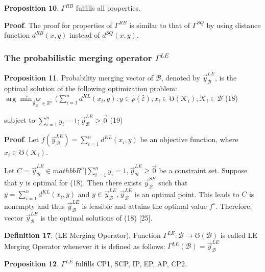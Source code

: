 \documentclass[10pt,a4paper]{IOS-Book-Article}
\begin{document}
\textbf{Proposition 10}. $\Gamma^{RB}$ fulfills all properties.

\textbf{Proof}. The proof for properties of $\Gamma^{RB}$ is similar
to that of $\Gamma^{SQ}$ by using distance function $d^{RB}(x, y)$
instead of $d^{SQ}(x, y)$.

\subsubsection{The probabilistic merging operator $\Gamma^{LE}$}

\textbf{Proposition 11}. Probability merging vector of $\mathcal{B}$,
denoted by $\vec{y}^{LE}_\mathcal{B}$, is the optimal solution of the following optimization problem:
$\arg \min_{\vec{y}^{LE}_\mathcal{B} \in \mathbb{R}^n} (\sum^n_{i=1} d^{KL}(x_i, y) : 
y \in \hat{p}(\hat{\varepsilon}); x_i \in \mho(\mathcal{K}_i);\mathcal{K}_i \in \mathcal{B}$ (18)

subject to $\sum^n_{i=1} y_i = 1; \vec{y}^{LE}_\mathcal{B} \geq \vec{0}$ (19)

\textbf{Proof}. Let $f(\vec{y}^{LE}_\mathcal{B} ) = \sum^n_{i=1} d^{KL}(x_i, y)$ be an objective function, where $x_i \in \mho(\mathcal{K}_i)$.

Let $C = {\vec{y}^{LE}_\mathcal{B} \in mathbb{R}^n|\sum^n_{i=1} y_i = 1, \vec{y}^{LE}_\mathcal{B} \geq \vec{0} }$ be a
constraint set. Suppose that y is optimal for (18).
Then there exists $\vec{y}^{SE}_\mathcal{B}$ such that $y = \sum^n_{i=1} d^{KL}(x_i, y)$
and $y \in \vec{y}^{LE}_\mathcal{B} , \vec{y}^{LE}_\mathcal{B}$ is an optimal point. This leads to
$C$ is nonempty and thus $\vec{y}^{LE}_\mathcal{B}$ is feasible and attains
the optimal value $f^∗$. Therefore, vector $\vec{y}^{LE}_\mathcal{B}$ is the
optimal solutions of (18) [25].

\textbf{Definition 17}. (LE Merging Operator). Function 
$\Gamma^{LE} : \mathcal{B} \to \mho(\mathcal{B})$ is called LE Merging Operator
whenever it is defined as follows: $\Gamma^{LE}(\mathcal{B}) = \vec{y}^{LE}_\mathcal{B}$

\textbf{Proposition 12}. $\Gamma^{LE}$ fulfills CP1, SCP, IP, EP, AP, CP2.
\end{document}
